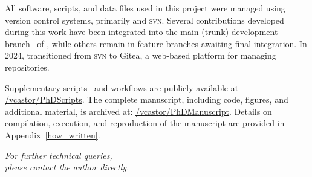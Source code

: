 All software, scripts, and data files used in this project were managed using
version control systems, primarily \git and \textsc{svn}. Several contributions
developed during this work have been integrated into the main (trunk)
development branch~\faCodeBranch\xspace of \ams, while others remain in feature
branches awaiting final integration. In 2024, \scm transitioned from
\textsc{svn} to Gitea, a web-based platform for managing \git repositories.

Supplementary scripts~\faCode\xspace and workflows are publicly available at
\href{http://www.github.com/vcastor/PhDscripts}{\faGithub/vcastor/PhDScripts}.
The complete manuscript, including code, figures, and additional material, is
archived at:
\href{http://www.github.com/vcastor/PhDManuscript}{\faGithub/vcastor/PhDManuscript}.
Details on compilation, execution, and reproduction of the manuscript are
provided in Appendix~\ref{how_written}.

\scriptsize
\begin{flushright}
  \textit{For further technical queries,\\
  please contact the author directly.}
\end{flushright}
\normalsize

